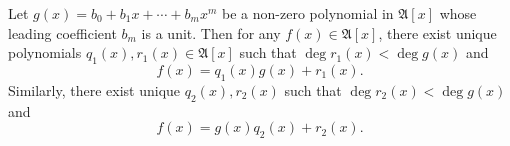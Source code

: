 Let $g(x) = b_0 + b_1x + \cdots + b_mx^m$ be a non-zero polynomial in $\mathfrak{A}[x]$ whose leading coefficient $b_m$ is a unit. Then for any $f(x) \in \mathfrak{A}[x]$, there exist unique polynomials $q_1(x), r_1(x) \in \mathfrak{A}[x]$ such that $\deg r_1(x) < \deg g(x)$ and
$$f(x) = q_1(x)g(x) + r_1(x).$$
Similarly, there exist unique $q_2(x), r_2(x)$ such that $\deg r_2(x) < \deg g(x)$ and
$$f(x) = g(x)q_2(x) + r_2(x).$$
